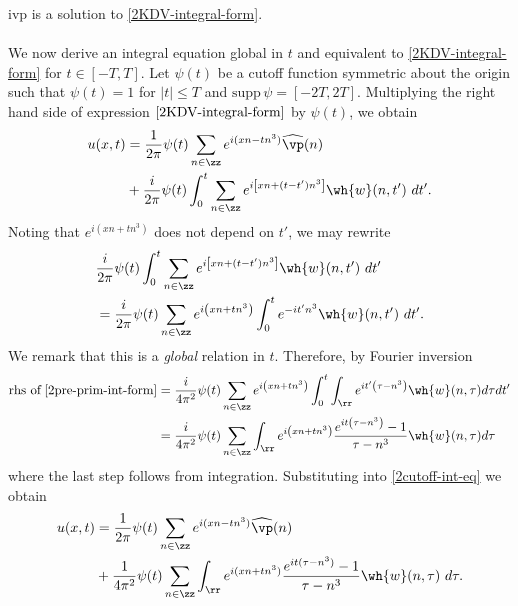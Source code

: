 ivp is a solution to \eqref{2KDV-integral-form}. 
\\
\\
%
%
We now derive an integral 
equation global in $t$ and equivalent to \eqref{2KDV-integral-form} for $t 
\in [-T, T]$. Let $\psi(t)$ be a cutoff function symmetric about the 
origin such that $\psi(t) = 1$ for $|t| \le T$ and $\text{supp} \, \psi 
= [-2T, 2T ]$. Multiplying the right hand side of expression
$\eqref{2KDV-integral-form}$ by $\psi(t)$, we obtain
%
%
\begin{equation}
	\begin{split}
		\label{2cutoff-int-eq}
		u(x, t)
		& = \frac{1}{2 \pi} \psi(t) \sum_{n \in \zz} e^{i(xn - t n^3)} \widehat{\vp}(n) 
		\\
		& + \frac{i }{2 \pi} \psi(t) \int_0^t \sum_{n \in \zz} 
		e^{i\left[ xn + (t - t')n^3 \right]} \wh{w}(n, t') \ dt'.
	\end{split}
\end{equation}
%
%
Noting that $e^{i\left( xn + tn^3 \right)}$ 
does not depend on $t'$, we may rewrite
%
%
\begin{equation}
	\label{2pre-prim-int-form}
	\begin{split}
		& \frac{i }{2 \pi} \psi(t) \int_0^t \sum_{n \in \zz} 
		e^{i\left[ xn + (t - t') n^3 \right]} \wh{w}(n, t') \ dt'
		\\
		& = \frac{i}{2 \pi} \psi(t) \sum_{n \in \zz} e^{i\left( xn + t 
		 n^3 
		\right)} \int_0^t e^{- it'n^3} \wh{w}(n, t') \ dt'.
	\end{split}
\end{equation}
We remark that this is a \emph{global} relation in $t$. Therefore, by Fourier 
inversion
%
%
%
%
%
%
%
\begin{equation*}
	\begin{split}
		\text{rhs of} \; \eqref{2pre-prim-int-form}
		& = \frac{i}{4 \pi^2} \psi (t) \sum_{n \in \zz} e^{i\left( xn + t 
		 n^3
		\right)} \int_0^t \int_\rr e^{it'\left( \tau - n^3 \right) }
		\wh{w}(n, \tau) d \tau dt'
		\\
		& = \frac{i}{4 \pi^2} \psi(t) \sum_{n \in \zz} \int_\rr 
		e^{i\left( xn + tn^3 \right)} \frac{e^{it\left( \tau - n^3 
		\right)}-1}{\tau - n^3} \wh{w}(n, \tau) d \tau
	\end{split}
\end{equation*}
%
%
where the last step follows from integration. Substituting
into \eqref{2cutoff-int-eq} we obtain
%
%
\begin{equation}
	\begin{split}
		\label{2cutoff-int-eq-2}
		u(x, t)
		& = \frac{1}{2 \pi} \psi(t) \sum_{n \in \zz} e^{i(xn - tn^3)} \widehat{\vp}(n) 
		\\
		& + \frac{1}{4 \pi^2} \psi(t) \sum_{n \in \zz} \int_\rr
		e^{i(xn + t n^3)} \frac{e^{it(\tau - n^3)}- 1}{\tau - n^3} 
		\wh{w}(n, \tau) \ d \tau.
	\end{split}
\end{equation}
